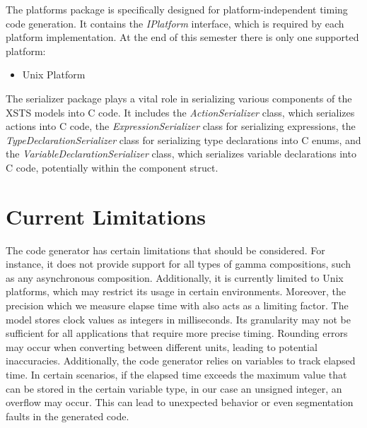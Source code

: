 The platforms package is specifically designed for platform-independent timing code generation. It contains the \textit{IPlatform} interface, which is required by each platform implementation. At the end of this semester there is only one supported platform:

\begin{itemize}
	\item Unix Platform
\end{itemize}

The serializer package plays a vital role in serializing various components of the XSTS models into C code. It includes the \textit{ActionSerializer} class, which serializes actions into C code, the \textit{ExpressionSerializer} class for serializing expressions, the \textit{TypeDeclarationSerializer} class for serializing type declarations into C enums, and the \textit{VariableDeclarationSerializer} class, which serializes variable declarations into C code, potentially within the component struct.

\section{Current Limitations}

The code generator has certain limitations that should be considered. For instance, it does not provide support for all types of gamma compositions, such as any asynchronous composition. Additionally, it is currently limited to Unix platforms, which may restrict its usage in certain environments. Moreover, the precision which we measure elapse time with also acts as a limiting factor. The model stores clock values as integers in milliseconds. Its granularity may not be sufficient for all applications that require more precise timing. Rounding errors may occur when converting between different units, leading to potential inaccuracies. Additionally, the code generator relies on variables to track elapsed time. In certain scenarios, if the elapsed time exceeds the maximum value that can be stored in the certain variable type, in our case an unsigned integer, an overflow may occur. This can lead to unexpected behavior or even segmentation faults in the generated code.
